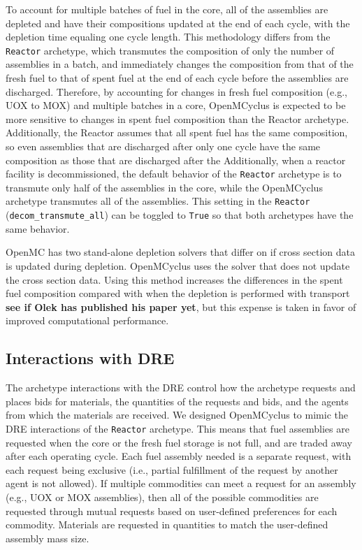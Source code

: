 To account for multiple batches of fuel in the core, all of the assemblies 
are depleted and have their compositions updated 
at the end of each cycle, with the depletion time equaling one cycle 
length. This methodology differs from the \Cycamore 
\texttt{Reactor} archetype, which transmutes the composition of only the 
number of 
assemblies in a batch, and immediately changes the composition from that 
of the fresh fuel to that of spent fuel at the end of each cycle before the 
assemblies are discharged. Therefore, by accounting for 
changes in fresh fuel composition (e.g., UOX to MOX) and multiple 
batches in a core, OpenMCyclus is expected to be more sensitive to 
changes in spent fuel composition than the \Cycamore Reactor archetype. 
Additionally, the \Cycamore Reactor assumes that all spent fuel has the 
same composition, so even assemblies that are discharged after only one 
cycle have the same composition as those that are discharged after the
Additionally, when a reactor facility is decommissioned, the default behavior 
of the \Cycamore \texttt{Reactor} archetype is to transmute only half of the assemblies 
in the core, while the OpenMCyclus archetype transmutes all of the assemblies. 
This setting in the \Cycamore \texttt{Reactor} (\texttt{decom\_transmute\_all}) can be 
toggled to \texttt{True} so that both archetypes have the same behavior.

OpenMC has two stand-alone depletion solvers that differ on if cross section 
data is updated during depletion. OpenMCyclus uses the solver that does 
not update the cross section data. Using this method increases 
the differences in the spent fuel composition compared with when the depletion 
is performed with transport \textbf{see if Olek has published his paper yet},
but this expense is taken in favor of improved computational performance.

\subsection{Interactions with DRE}
The archetype interactions with the \Cyclus \gls{DRE} control how
the archetype requests and places bids for materials, the quantities 
of the requests and bids, and the agents from which the materials 
are received. We designed OpenMCyclus to mimic the \gls{DRE} 
interactions of the \Cycamore \texttt{Reactor} archetype. This means that 
fuel assemblies are requested when the core or the fresh fuel 
storage is not full, and are traded away after each operating cycle. 
Each fuel assembly needed is a separate request, with each request 
being exclusive (i.e., partial fulfillment of the request by another 
agent is not allowed). If multiple commodities can meet a request for 
an assembly (e.g., UOX or MOX assemblies), then all of the possible 
commodities are requested through mutual requests based on user-defined 
preferences for each commodity. Materials are requested in quantities 
to match the user-defined assembly mass size. 

